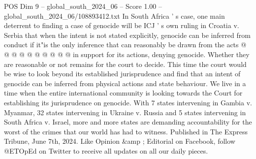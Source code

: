 \begin{textsample}{POS Dim 9 – global\_south\_2024\_06 – Score 1.00 – global\_south\_2024\_06/108893412.txt}
In South Africa ' s case, one main deterrent to finding a case of genocide will be ICJ ' s own ruling in Croatia v.
Serbia that when the intent is not stated explicitly, genocide can be inferred from conduct if it"is the only inference that can reasonably be drawn from the acts @ @ @ @ @ @ @ @ @ @ in support for its actions, denying genocide.
Whether they are reasonable or not remains for the court to decide.
This time the court would be wise to look beyond its established jurisprudence and find that an intent of genocide can be inferred from physical actions and state behaviour.
We live in a time when the entire international community is looking towards the Court for establishing its jurisprudence on genocide.
With 7 states intervening in Gambia v.
Myanmar, 32 states intervening in Ukraine v.
Russia and 5 states intervening in South Africa v.
Israel, more and more states are demanding accountability for the worst of the crimes that our world has had to witness.
Published in The Express Tribune, June 7th, 2024.
Like Opinion \&amp ; Editorial on Facebook, follow @ETOpEd on Twitter to receive all updates on all our daily pieces.

\end{textsample}
